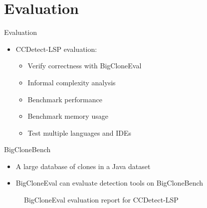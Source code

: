 \documentclass[aspectratio=1610, xcolor=table]{beamer}
\begin{document}
\section{Evaluation}
\begin{frame}{Evaluation}
    \begin{itemize}
        \item CCDetect-LSP evaluation:
            \begin{itemize}
                \item Verify correctness with BigCloneEval
                \item Informal complexity analysis
                \item Benchmark performance
                \item Benchmark memory usage
                \item Test multiple languages and IDEs
            \end{itemize}
    \end{itemize}
\end{frame}

\begin{frame}{BigCloneBench}
    \begin{itemize}
        \item A large database of clones in a Java dataset
        \item BigCloneEval can evaluate detection tools on BigCloneBench
    \end{itemize}
    \begin{figure}
    \begin{alltt}
        
    \end{alltt}
    \caption{BigCloneEval evaluation report for CCDetect-LSP}
    \label{bcblog}
\end{figure}
\end{frame}
\end{document}
